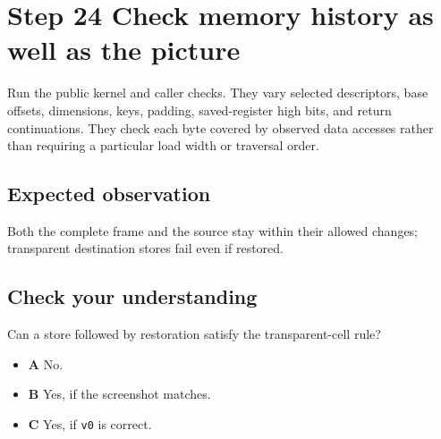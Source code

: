 \section{Step 24 Check memory history as well as the picture}\label{blit-s24}

Run the public kernel and caller checks. They vary selected descriptors, base offsets, dimensions, keys, padding, saved-register high bits, and return continuations. They check each byte covered by observed data accesses rather than requiring a particular load width or traversal order.


\subsection{Expected observation}
Both the complete frame and the source stay within their allowed changes; transparent destination stores fail even if restored.

\subsection{Check your understanding}
Can a store followed by restoration satisfy the transparent-cell rule?

\begin{itemize}
  \item \textbf{A} No.
  \item \textbf{B} Yes, if the screenshot matches.
  \item \textbf{C} Yes, if \texttt{v0} is correct.
\end{itemize}
